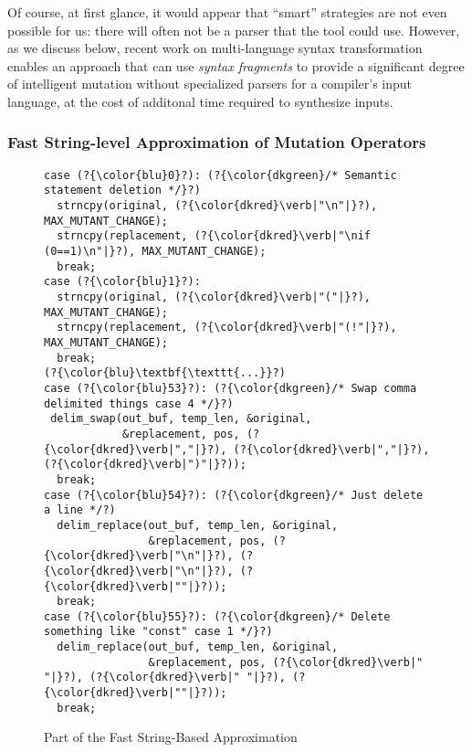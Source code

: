 Of course, at first
glance, it would appear that  ``smart'' strategies are not even
possible for us: there will often not be a parser that the
tool could use.  However, as we discuss below, recent work on
multi-language syntax transformation~\cite{combypaper} enables an approach that can use
\emph{syntax fragments} to provide a significant degree of intelligent
mutation without specialized parsers for a compiler's input language,
at the cost of additonal time required to synthesize inputs.

\begin{sloppypar}
\subsubsection{Fast String-level Approximation of Mutation Operators}
\label{strat-fast-string-level}

\begin{figure}[h!]
\begin{lstlisting}[basicstyle=\scriptsize\ttfamily,numbers=none,xleftmargin=0.7em,xrightmargin=.7em]
case (?{\color{blu}0}?): (?{\color{dkgreen}/* Semantic statement deletion */}?)
  strncpy(original, (?{\color{dkred}\verb|"\n"|}?), MAX_MUTANT_CHANGE);
  strncpy(replacement, (?{\color{dkred}\verb|"\nif (0==1)\n"|}?), MAX_MUTANT_CHANGE);
  break;
case (?{\color{blu}1}?):
  strncpy(original, (?{\color{dkred}\verb|"("|}?), MAX_MUTANT_CHANGE);
  strncpy(replacement, (?{\color{dkred}\verb|"(!"|}?), MAX_MUTANT_CHANGE);
  break;
(?{\color{blu}\textbf{\texttt{...}}?)
case (?{\color{blu}53}?): (?{\color{dkgreen}/* Swap comma delimited things case 4 */}?)
 delim_swap(out_buf, temp_len, &original, 
            &replacement, pos, (?{\color{dkred}\verb|","|}?), (?{\color{dkred}\verb|","|}?), (?{\color{dkred}\verb|")"|}?));
  break;
case (?{\color{blu}54}?): (?{\color{dkgreen}/* Just delete a line */?)
  delim_replace(out_buf, temp_len, &original, 
                &replacement, pos, (?{\color{dkred}\verb|"\n"|}?), (?{\color{dkred}\verb|"\n"|}?), (?{\color{dkred}\verb|""|}?));
  break;
case (?{\color{blu}55}?): (?{\color{dkgreen}/* Delete something like "const" case 1 */}?)
  delim_replace(out_buf, temp_len, &original, 
                &replacement, pos, (?{\color{dkred}\verb|" "|}?), (?{\color{dkred}\verb|" "|}?), (?{\color{dkred}\verb|""|}?));
  break;    
\end{lstlisting}
\caption{Part of the Fast String-Based Approximation}
\label{fig:foperators}
\end{figure}


\end{sloppypar}
